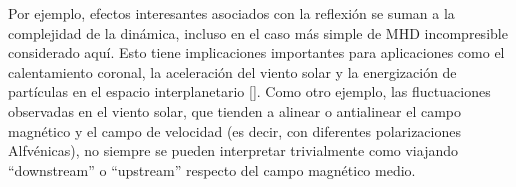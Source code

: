 Por ejemplo, efectos interesantes asociados con la reflexión se suman
a la complejidad de la dinámica, incluso en el caso más simple de MHD
incompresible considerado aquí. Esto tiene implicaciones importantes
para aplicaciones como el calentamiento coronal, la aceleración del
viento solar y la energización de partículas en el espacio
interplanetario [\cite{velli_1993_propagation, matthaeus_1999_coronal}].
Como otro ejemplo, las fluctuaciones observadas en el viento solar,
que tienden a alinear o antialinear el campo magnético y el campo de
velocidad (es decir, con diferentes polarizaciones Alfvénicas), no
siempre se pueden interpretar trivialmente como viajando
``downstream'' o ``upstream'' respecto del campo magnético medio.

